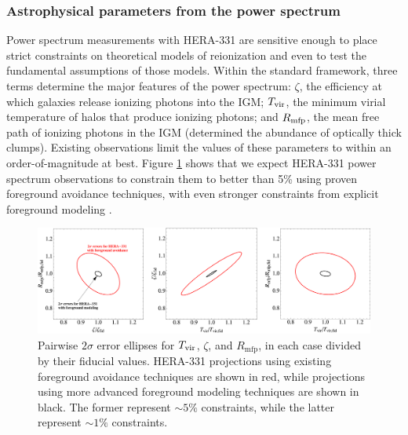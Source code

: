 \documentclass[preprint]{aastex}
\newcommand{\compress}{\vspace{-0.3in}}
\begin{document}
\compress
\subsubsection{Astrophysical parameters from the power spectrum}
\label{sec:ParamEst}

Power spectrum measurements with HERA-331 are sensitive enough to place strict constraints on theoretical models of
reionization and even to test the fundamental assumptions of those models.  Within the standard framework,
three terms determine the major features of the power spectrum: $\zeta$, the efficiency at which galaxies
release ionizing photons  into the IGM; $T_{\rm vir}$, the minimum virial temperature of halos that produce
ionizing photons; and $R_{\rm mfp}$, the mean free path of ionizing
photons in the IGM (determined the abundance of optically thick clumps).  Existing
observations limit the values of these parameters to within an order-of-magnitude at best.
Figure \ref{fig:ErrorEllipses} shows that we expect
HERA-331 power spectrum observations to constrain them to better
than 5\% using proven foreground avoidance techniques, with even stronger constraints from
explicit foreground modeling \citep{pober_et_al2014}.

\begin{figure}[t]\centering
\includegraphics[width=\textwidth]{plots/Pspec/OPTMIDellipses.pdf}
\caption{\small
Pairwise $2\sigma$ error ellipses for $T_{\rm vir}$, $\zeta$, and $R_\textrm{mfp}$, in each case divided by their fiducial values.  HERA-331 projections using existing foreground avoidance techniques are shown in red, while projections using more advanced foreground modeling techniques are shown in black.  The former represent $\sim 5\%$ constraints, while the latter represent $\sim 1\%$ constraints.\label{fig:ErrorEllipses}}
\end{figure}
\end{document}
